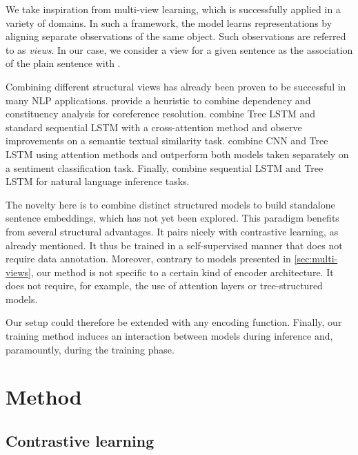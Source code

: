 We take inspiration from multi-view learning, which is successfully applied in a variety of domains. In such a framework, the model learns representations by aligning separate observations of the same object. Such observations are referred to as \textit{views}. In our case, we consider a view for a given sentence as the association of the plain sentence with . 

Combining different structural views has already been proven to be successful in many NLP applications. \textcite{kong_11} provide a heuristic to combine dependency and constituency analysis for coreference resolution. \textcite{zhou_16, ahmed_19_2} combine Tree LSTM and standard sequential LSTM with a cross-attention method and observe improvements on a semantic textual similarity task. \textcite{chen_liu_17} combine CNN and Tree LSTM using attention methods and outperform both models taken separately on a sentiment classification task. Finally, \textcite{chen_17} combine sequential LSTM and Tree LSTM for natural language inference tasks. 

The novelty here is to combine distinct structured models to build standalone sentence embeddings, which has not yet been explored. This paradigm benefits from several structural advantages. It pairs nicely with contrastive learning, as already mentioned. It  thus be trained in a self-supervised manner that does not require data annotation. Moreover, contrary to models presented in  \ref{sec:multi-views}, our method is not specific to a certain kind of encoder architecture. It does not require, for example, the use of attention layers or tree-structured models.

Our setup could therefore be extended with any encoding function. Finally, our training method induces an interaction between models during inference and, paramountly, during the training phase.

\section{Method}

\subsection{Contrastive learning}

